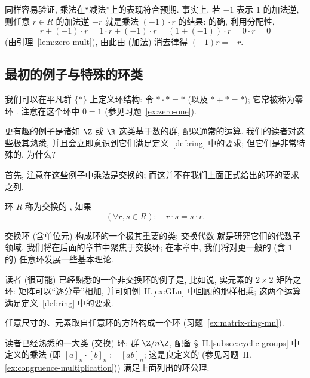同样容易验证, 乘法在``减法''上的表现符合预期. 事实上, 若 $-1$ 表示 $1$ 的加法逆, 则任意 $r \in R$ 的加法逆 $-r$ 就是乘法 $(-1) \cdot r$ 的结果: 的确, 利用分配性,
\[
r + (-1) \cdot r = 1 \cdot r + (-1) \cdot r = (1 + (-1)) \cdot r = 0 \cdot r = 0
\]
(由引理~\ref{lem:zero-mult}), 由此由 (加法) 消去律得 $(-1)r = -r$.

\subsection{最初的例子与特殊的环类}
\label{subsec:ring-examples}

\begin{example}
\label{ex:zero-ring}
我们可以在平凡群 $\{*\}$ 上定义环结构: 令 $* \cdot * = *$ (以及 $* + * = *$); 它常被称为零环%
. 注意在这个环中 $0 = 1$ (参见习题~\ref{ex:zero-one}).
\end{example}

\begin{example}
\label{ex:number-rings}
更有趣的例子是诸如 $\Z$ 或 $\R$ 这类基于数的群, 配以通常的运算. 我们的读者对这些极其熟悉, 并且会立即意识到它们满足定义~\ref{def:ring} 中的要求; 但它们是非常特殊的. 为什么?

首先, 注意在这些例子中乘法是交换的; 而这并不在我们上面正式给出的环的要求之列.
\end{example}

\begin{definition}
\label{def:commutative-ring}
环 $R$ 称为交换的%
, 如果
\[
(\forall r, s \in R): \quad r \cdot s = s \cdot r.
\]
\end{definition}

交换环 (含单位元) 构成环的一个极其重要的类; 交换代数%
就是研究它们的代数子领域. 我们将在后面的章节中聚焦于交换环; 在本章中, 我们将对更一般的 (含 $1$ 的) 任意环发展一些基本理论.

\begin{example}
\label{ex:matrix-ring}
读者 (很可能) 已经熟悉的一个非交换环的例子是, 比如说, 实元素的 $2 \times 2$ 矩阵之环: 矩阵可以``逐分量''相加, 并可如例~II.\ref{ex:GLn} 中回顾的那样相乘; 这两个运算满足定义~\ref{def:ring} 中的要求.

任意尺寸的、元素取自任意环的方阵构成一个环 (习题~\ref{ex:matrix-ring-mn}).
\end{example}

\begin{example}
\label{ex:zn-rings}
读者已经熟悉的一大类 (交换) 环: 群 $\Z/n\Z$, 配备 \S~II.\ref{subsec:cyclic-groups} 中定义的乘法 (即 $[a]_n \cdot [b]_n := [ab]_n$; 这是良定义的 (参见习题~II.\ref{ex:congruence-multiplication})) 满足上面列出的环公理.
\end{example}

